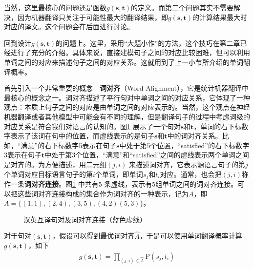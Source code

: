 \parinterval  当然，这里最核心的问题还是函数$g(\mathbf{s},\mathbf{t})$的定义。而第二个问题其实不需要解决，因为机器翻译只关注于可能性最大的翻译结果，即$g(\mathbf{s},\mathbf{t})$的计算结果最大时对应的译文。这个问题会在后面进行讨论。

\parinterval 回到设计$g(\mathbf{s},\mathbf{t})$的问题上。这里，采用``大题小作''的方法，这个技巧在第二章已经进行了充分的介绍。具体来说，直接建模句子之间的对应比较困难，但可以利用单词之间的对应来描述句子之间的对应关系。这就用到了上一小节所介绍的单词翻译概率。

\parinterval 首先引入一个非常重要的概念\ \dash \ {\small\sffamily\bfseries{词对齐}}（Word Alignment），它是统计机器翻译中最核心的概念之一。词对齐描述了平行句对中单词之间的对应关系，它体现了一种观点：本质上句子之间的对应是由单词之间的对应表示的。当然，这个观点在神经机器翻译或者其他模型中可能会有不同的理解，但是翻译句子的过程中考虑词级的对应关系是符合我们对语言的认知的。图\ref{fig:3-7} 展示了一个句对$\mathbf{s}$和$\mathbf{t}$，单词的右下标数字表示了该词在句中的位置，而虚线表示的是句子$\mathbf{s}$和$\mathbf{t}$中的词对齐关系。比如，``满意''的右下标数字5表示在句子$\mathbf{s}$中处于第5个位置，``satisfied''的右下标数字3表示在句子$\mathbf{t}$中处于第3个位置，``满意''和``satisfied''之间的虚线表示两个单词之间是对齐的。为方便描述，用二元组$(j,i)$ 来描述词对齐，它表示源语言句子的第$j$个单词对应目标语言句子的第$i$个单词，即单词$s_j$和$t_i$对应。通常，也会把$(j,i)$称作一条{\small\sffamily\bfseries{词对齐连接}}。图\ref{fig:3-7} 中共有5 条虚线，表示有5组单词之间的词对齐连接。可以把这些词对齐连接构成的集合作为词对齐的一种表示，记为$A$，即$A={\{(1,1),(2,4),(3,5),(4,2)(5,3)}\}$。

\begin{figure}[htp]
    \centering

    \caption{汉英互译句对及词对齐连接（蓝色虚线）}
    \label{fig:3-7}
\end{figure}
\vspace{-0.5em}

\parinterval 对于句对$(\mathbf{s},\mathbf{t})$，假设可以得到最优词对齐$\widehat{A}$，于是可以使用单词翻译概率计算$g(\mathbf{s},\mathbf{t})$，如下
\begin{eqnarray}
g(\mathbf{s},\mathbf{t}) = \prod_{(j,i)\in \widehat{A}}\textrm{P}(s_j,t_i)
\label{eq:3-7}
\end{eqnarray}

